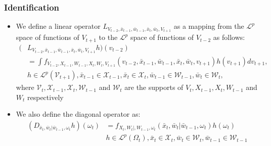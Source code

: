 \documentclass{beamer}
\begin{document}
\begin{frame}
\frametitle{Identification}
\begin{itemize}
\item We define a linear operator $L_{V_{t-2},\bar{x}_{t-1},\bar{w}_{t-1},\bar{x}_{t},\bar{w}_{t}, V_{t+1}}$ as a mapping from the $\mathcal{L}^{p}$ space of functions of $V_{t+1}$ to the $\mathcal{L}^{p}$ space of functions of $V_{t-2}$ as follows:
\small
\begin{equation}\label{operator}
    \begin{split}
     (&L_{V_{t-2},\bar{x}_{t-1},\bar{w}_{t-1},\bar{x}_{t},\bar{w}_{t}, V_{t+1}}h)(v_{t-2})\\
     &=\int f_{V_{t-2}, X_{t-1}, W_{t-1}, X_{t}, W_{t}, V_{t+1}}(v_{t-2}, \bar{x}_{t-1}, \bar{w}_{t-1}, \bar{x}_{t}, \bar{w}_{t}, v_{t+1})h(v_{t+1})dv_{t+1},\\
     &h\in \mathcal{L}^{p}(\mathcal{V}_{t+1}), \bar{x}_{t-1}\in \mathcal{X}_{t-1}, \bar{x}_{t}\in \mathcal{X}_{t}, \bar{w}_{t-1}\in \mathcal{W}_{t-1}, \bar{w}_{t}\in \mathcal{W}_{t},
    \end{split}
\end{equation}
\normalsize
where $\mathcal{V}_{t}, \mathcal{X}_{t-1}, \mathcal{X}_{t}, \mathcal{W}_{t-1}$ and $\mathcal{W}_{t}$ are the supports of $V_{t}, X_{t-1}, X_{t}, W_{t-1}$ and $W_{t}$ respectively
\item We also define the diagonal operator as:
\begin{equation}\label{diagonal}
    \begin{split}
        (D_{\bar{x}_{t}, \bar{w}_{t}|\bar{w}_{t-1}, \omega_{t}}h)(\omega_{t})&=f_{X_{t}, W_{t}|, W_{t-1}, \omega_{t}}(\bar{x}_{t}, \bar{w}_{t}|\bar{w}_{t-1}, \omega_{t})h(\omega_{t})\\
        &h\in \mathcal{L}^{p}(\Omega_{t}), \bar{x}_{t}\in \mathcal{X}_{t}, \bar{w}_{t}\in \mathcal{W}_{t}, \bar{w}_{t-1}\in \mathcal{W}_{t-1}
    \end{split}
\end{equation}
\end{itemize}
\end{frame}
\end{document}
